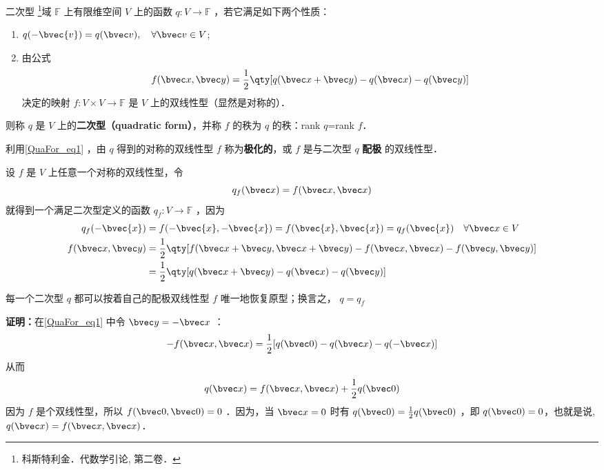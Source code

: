 
\begin{definition}{二次型}
\footnote{科斯特利金．代数学引论, 第二卷．}域 $\mathbb{F}$ 上有限维空间 $V$ 上的函数 $q:V\rightarrow\mathbb{F}$ ，若它满足如下两个性质：
\begin{enumerate}
\item $q(-\bvec{v})=q(\bvec v),\quad \forall\bvec v\in V$;
\item 由公式
\begin{equation}\label{QuaFor_eq1}
f(\bvec x,\bvec y)=\frac{1}{2}\qty[q(\bvec x+\bvec y)-q(\bvec x)-q(\bvec y)]
\end{equation}
决定的映射 $f:V\times V\rightarrow\mathbb{F}$ 是 $V$ 上的双线性型（显然是对称的）．
\end{enumerate}
则称 $q$ 是 $V$ 上的\textbf{二次型（quadratic form）}，并称 $f$ 的秩为 $q$ 的秩：rank $q$=rank $f$．
\end{definition}
利用\autoref{QuaFor_eq1} ，由 $q$ 得到的对称的双线性型 $f$ 称为\textbf{极化的}，或 $f$ 是与二次型 $q$ \textbf{配极} 的双线性型．
\begin{example}{}
设 $f$ 是 $V$ 上任意一个对称的双线性型，令
\begin{equation}
q_f(\bvec x)=f(\bvec x,\bvec x)
\end{equation}
就得到一个满足二次型定义的函数 $q_f:V\rightarrow\mathbb{F}$ ，因为
\begin{equation}
\begin{aligned}
q_f(-\bvec{x})&=f(-\bvec{x},-\bvec{x})=f(\bvec{x},\bvec{x})=q_f(\bvec{x}) \quad \forall\bvec x\in V\\
f(\bvec x,\bvec y)&=\frac{1}{2}\qty[f(\bvec x+\bvec y,\bvec x+\bvec y)-f(\bvec x,\bvec x)-f(\bvec y,\bvec y)]\\
&=\frac{1}{2}\qty[q(\bvec x+\bvec y)-q(\bvec x)-q(\bvec y)]
\end{aligned}
\end{equation}
\end{example}
\begin{theorem}{}\label{QuaFor_the1}
每一个二次型 $q$ 都可以按着自己的配极双线性型 $f$ 唯一地恢复原型；换言之， $q=q_f$
\end{theorem}
\textbf{证明：}在\autoref{QuaFor_eq1} 中令 $\bvec y=-\bvec x$ ：
\begin{equation}
-f(\bvec x,\bvec x)=\frac{1}{2}[q(\bvec 0)-q(\bvec x)-q(-\bvec x)]
\end{equation}
从而
\begin{equation}
q(\bvec x)=f(\bvec x,\bvec x)+\frac{1}{2}q(\bvec 0)
\end{equation}
因为 $f$ 是个双线性型，所以 $f(\bvec 0,\bvec 0)=0$ ．因为，当 $\bvec x=0$ 时有 $q(\bvec 0)=\frac{1}{2}q(\bvec 0)$ ，即 $q(\bvec 0)=0$，也就是说, $q(\bvec x)=f(\bvec x,\bvec x)$．

